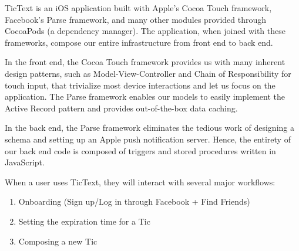 TicText is an iOS application built with Apple's Cocoa Touch framework, Facebook's Parse framework, and many other modules provided through CocoaPods (a dependency manager). The application, when joined with these frameworks, compose our entire infrastructure from front end to back end.

In the front end, the Cocoa Touch framework provides us with many inherent design patterns, such as Model-View-Controller and Chain of Responsibility for touch input, that trivialize most device interactions and let us focus on the application. The Parse framework enables our models to easily implement the Active Record pattern and provides out-of-the-box data caching.

In the back end, the Parse framework eliminates the tedious work of designing a schema and setting up an Apple push notification server. Hence, the entirety of our back end code is composed of triggers and stored procedures written in JavaScript.


\noindent When a user uses TicText, they will interact with several major workflows:
\begin{enumerate}
	\item Onboarding (Sign up/Log in through Facebook + Find Friends)
	\item Setting the expiration time for a Tic
	\item Composing a new Tic
\end{enumerate}

\renewcommand\listfigurename{List of Diagrams}
\listoffigures

